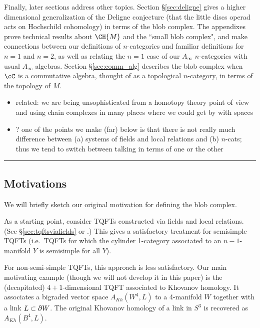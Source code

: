 Finally, later sections address other topics.
Section \S \ref{sec:deligne} gives
a higher dimensional generalization of the Deligne conjecture (that the little discs operad acts on Hochschild cohomology) in terms of the blob complex.
The appendixes prove technical results about $\CH{M}$ and the ``small blob complex", 
and make connections between our definitions of $n$-categories and familiar definitions for $n=1$ and $n=2$, 
as well as relating the $n=1$ case of our $A_\infty$ $n$-categories with usual $A_\infty$ algebras. Section \S \ref{sec:comm_alg} describes the blob complex when $\cC$ is a commutative algebra, 
thought of as a topological $n$-category, in terms of the topology of $M$.


\begin{itemize}
\item related: we are being unsophisticated from a homotopy theory point of
view and using chain complexes in many places where we could get by with spaces
\item ? one of the points we make (far) below is that there is not really much
difference between (a) systems of fields and local relations and (b) $n$-cats;
thus we tend to switch between talking in terms of one or the other
\end{itemize}

\medskip\hrule\medskip

\subsection{Motivations}
\label{sec:motivations}

We will briefly sketch our original motivation for defining the blob complex.

As a starting point, consider TQFTs constructed via fields and local relations.
(See \S\ref{sec:tqftsviafields} or \cite{kw:tqft}.)
This gives a satisfactory treatment for semisimple TQFTs
(i.e.\ TQFTs for which the cylinder 1-category associated to an
$n{-}1$-manifold $Y$ is semisimple for all $Y$).

For non-semi-simple TQFTs, this approach is less satisfactory.
Our main motivating example (though we will not develop it in this paper)
is the (decapitated) $4{+}1$-dimensional TQFT associated to Khovanov homology.
It associates a bigraded vector space $A_{Kh}(W^4, L)$ to a 4-manifold $W$ together
with a link $L \subset \partial W$.
The original Khovanov homology of a link in $S^3$ is recovered as $A_{Kh}(B^4, L)$.

